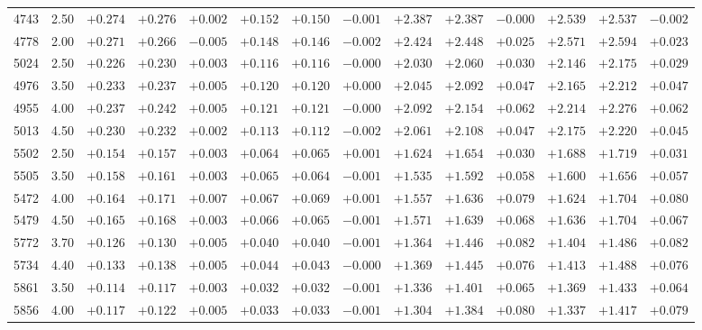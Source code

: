 \documentclass[]{aa}
\begin{document}
\begin{appendix}
\begin{table*}
\begin{center}
\begin{tabular}{llllllllllllll}
4743  &2.50 & $+0.274$ & $+0.276$ & $+0.002$ & $+0.152$ & $+0.150$ & $-0.001$ & $+2.387$ & $+2.387$ & $-0.000$ & $+2.539$ & $+2.537$ & $-0.002$ \\
4778  &2.00 & $+0.271$ & $+0.266$ & $-0.005$ & $+0.148$ & $+0.146$ & $-0.002$ & $+2.424$ & $+2.448$ & $+0.025$ & $+2.571$ & $+2.594$ & $+0.023$ \\
5024  &2.50 & $+0.226$ & $+0.230$ & $+0.003$ & $+0.116$ & $+0.116$ & $-0.000$ & $+2.030$ & $+2.060$ & $+0.030$ & $+2.146$ & $+2.175$ & $+0.029$ \\
4976  &3.50 & $+0.233$ & $+0.237$ & $+0.005$ & $+0.120$ & $+0.120$ & $+0.000$ & $+2.045$ & $+2.092$ & $+0.047$ & $+2.165$ & $+2.212$ & $+0.047$ \\
4955  &4.00 & $+0.237$ & $+0.242$ & $+0.005$ & $+0.121$ & $+0.121$ & $-0.000$ & $+2.092$ & $+2.154$ & $+0.062$ & $+2.214$ & $+2.276$ & $+0.062$ \\
5013  &4.50 & $+0.230$ & $+0.232$ & $+0.002$ & $+0.113$ & $+0.112$ & $-0.002$ & $+2.061$ & $+2.108$ & $+0.047$ & $+2.175$ & $+2.220$ & $+0.045$ \\
5502  &2.50 & $+0.154$ & $+0.157$ & $+0.003$ & $+0.064$ & $+0.065$ & $+0.001$ & $+1.624$ & $+1.654$ & $+0.030$ & $+1.688$ & $+1.719$ & $+0.031$ \\
5505  &3.50 & $+0.158$ & $+0.161$ & $+0.003$ & $+0.065$ & $+0.064$ & $-0.001$ & $+1.535$ & $+1.592$ & $+0.058$ & $+1.600$ & $+1.656$ & $+0.057$ \\
5472  &4.00 & $+0.164$ & $+0.171$ & $+0.007$ & $+0.067$ & $+0.069$ & $+0.001$ & $+1.557$ & $+1.636$ & $+0.079$ & $+1.624$ & $+1.704$ & $+0.080$ \\
5479  &4.50 & $+0.165$ & $+0.168$ & $+0.003$ & $+0.066$ & $+0.065$ & $-0.001$ & $+1.571$ & $+1.639$ & $+0.068$ & $+1.636$ & $+1.704$ & $+0.067$ \\
5772  &3.70 & $+0.126$ & $+0.130$ & $+0.005$ & $+0.040$ & $+0.040$ & $-0.001$ & $+1.364$ & $+1.446$ & $+0.082$ & $+1.404$ & $+1.486$ & $+0.082$ \\
5734  &4.40 & $+0.133$ & $+0.138$ & $+0.005$ & $+0.044$ & $+0.043$ & $-0.000$ & $+1.369$ & $+1.445$ & $+0.076$ & $+1.413$ & $+1.488$ & $+0.076$ \\
5861  &3.50 & $+0.114$ & $+0.117$ & $+0.003$ & $+0.032$ & $+0.032$ & $-0.001$ & $+1.336$ & $+1.401$ & $+0.065$ & $+1.369$ & $+1.433$ & $+0.064$ \\
5856  &4.00 & $+0.117$ & $+0.122$ & $+0.005$ & $+0.033$ & $+0.033$ & $-0.001$ & $+1.304$ & $+1.384$ & $+0.080$ & $+1.337$ & $+1.417$ & $+0.079$ \\

\end{tabular}
\end{center}
\end{table*}
\end{appendix}
\end{document}
